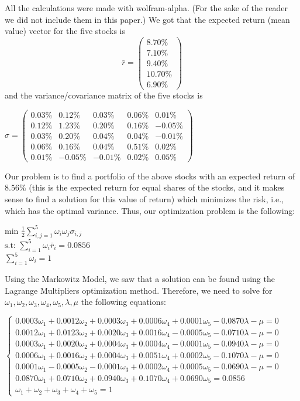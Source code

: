 \documentclass{article}
\begin{document}
All the calculations were made with wolfram-alpha. (For the sake of the reader we did not include them in this paper.) We got that the expected return (mean value) vector for the five stocks is 
$$\bar{r}=\begin{pmatrix}
8.70\%\\
7.10\%\\
9.40\%\\
10.70\%\\
6.90\%
\end{pmatrix}$$
and the variance/covariance matrix of the five stocks is 
\begin{center}
    $\sigma=\begin{pmatrix}
    0.03\% & 0.12\% & 0.03\% & 0.06\% & 0.01\%\\
    0.12\% & 1.23\% & 0.20\% & 0.16\% & -0.05\%\\
    0.03\% & 0.20\% & 0.04\% & 0.04\% & -0.01\%\\
    0.06\% & 0.16\% & 0.04\% & 0.51\% & 0.02\%\\
    0.01\% & -0.05\% & -0.01\% & 0.02\% & 0.05\%
    \end{pmatrix}$
\end{center}
Our problem is to find a portfolio of the above stocks with an expected return of $8.56\%$ (this is the expected return for equal shares of the stocks, and it makes sense to find a solution for this value of return) which minimizes the risk, i.e., which has the optimal variance. Thus, our optimization problem is the following:
\begin{center}
    $\text{min }\frac{1}{2}\sum_{i, j =1}^{5}{\omega_i \omega_j \sigma_{i, j}}$\\
    $\text{s.t: } \sum_{i=1}^5{\omega_i\bar{r}_i} = 0.0856$\\
    $\sum_{i=1}^5{\omega_i}=1$
\end{center}
Using the Markowitz Model, we saw that a solution can be found using the Lagrange Multipliers optimization method. Therefore, we need to solve for 
$\omega_1, \omega_2, \omega_3, \omega_4, \omega_5, \lambda, \mu$ the following equations:
\begin{center}
$\begin{cases}
        0.0003\omega_1 +0.0012\omega_2 +0.0003\omega_3 +0.0006\omega_4 +0.0001\omega_5 -0.0870\lambda -\mu = 0\\
    0.0012\omega_1 +0.0123\omega_2 +0.0020\omega_3 +0.0016\omega_4 -0.0005\omega_5 -0.0710\lambda -\mu = 0\\
    0.0003\omega_1 +0.0020\omega_2 +0.0004\omega_3 +0.0004\omega_4 -0.0001\omega_5 -0.0940\lambda -\mu = 0\\
    0.0006\omega_1 +0.0016\omega_2 +0.0004\omega_3 +0.0051\omega_4 +0.0002\omega_5 -0.1070\lambda -\mu = 0\\
    0.0001\omega_1 -0.0005\omega_2 -0.0001\omega_3 +0.0002\omega_4 +0.0005\omega_5 -0.0690\lambda -\mu = 0\\
    0.0870\omega_1 +0.0710\omega_2 +0.0940\omega_3+0.1070\omega_4+0.0690\omega_5 = 0. 0856\\
    \omega_1+\omega_2+\omega_3+\omega_4+\omega_5 = 1
\end{cases}$
\end{center}
\end{document}
